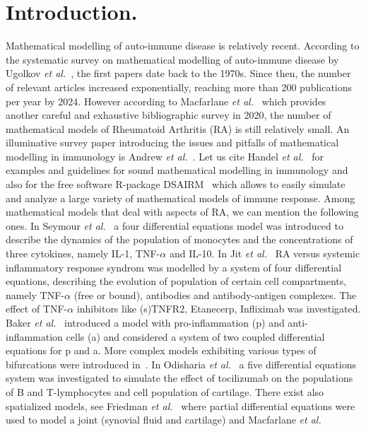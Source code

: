\documentclass[a4paper, 12pt]{article}
\begin{document}
\section{Introduction.}
Mathematical modelling of  auto-immune disease is relatively recent.
According to the systematic survey on mathematical modelling of auto-immune disease by  Ugolkov \textit{et al.}~\cite{frontiers2024},
the ﬁrst papers date back to the 1970s. Since
then, the number of relevant articles increased exponentially,
reaching more than 200 publications per year by 2024. 
However according to Macfarlane \textit{et al.}~\cite{macfarlane2020} which provides another careful and exhaustive bibliographic survey in 2020, the number of  mathematical models of Rheumatoid Arthritis (RA) is still relatively small.
An illuminative survey paper introducing the issues and pitfalls of mathematical modelling in immunology is Andrew \textit{et al.}~\cite{andrew}. 
Let us cite Handel \textit{et al.}~\cite{Handel2020} for  examples and guidelines for sound mathematical modelling in immunology and also for the free software R-package DSAIRM~\cite{dsairm2019} which allows to easily simulate and analyze a large variety of mathematical models of immune response.
Among mathematical models that deal with aspects
of RA, we can mention the following ones.
In Seymour \textit{et al.}~\cite{seymour2001} a four differential equations model was introduced to describe the dynamics of the population of monocytes and the concentrations of three cytokines, namely IL-1, TNF-$\alpha$ and IL-10. 
In Jit \textit{et al.}~\cite{jit2005} RA versus systemic inflammatory response syndrom was modelled by a system of four differential equations, describing the evolution of population of certain cell compartments, namely TNF-$\alpha$ (free or bound), antibodies and antibody-antigen complexes.
The effect of TNF-$\alpha$ inhibitors like (s)TNFR2, Etanecerp, Infliximab was investigated.
Baker \textit{et al.}~\cite{baker2013} introduced a model with pro-inﬂammation 
(p) and anti-inﬂammation cells (a) and considered a system of two coupled differential equations for p and a. 
More complex models exhibiting various types of  bifurcations were introduced in~\cite{baker2017}. 
In Odisharia \textit{et al.}~\cite{jaiani2019} a five differential equations system was investigated to simulate the effect of tocilizumab on the populations of B and T-lymphocytes and cell population of cartilage.  
There exist also spatialized models, see Friedman \textit{et al.}~\cite{friedman} where partial differential equations were used to model a joint (synovial fluid and cartilage) and  Macfarlane \textit{et al.}~\cite{macfarlane2022}
\end{document}
